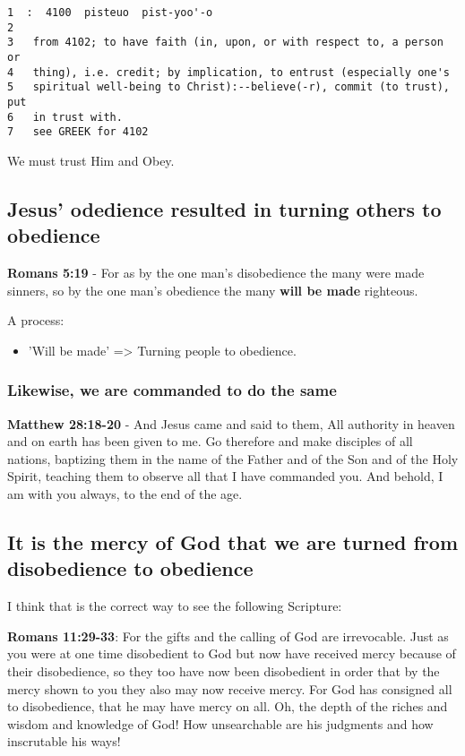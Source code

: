 \documentclass[11pt]{article}
\begin{document}
\begin{verbatim}
1  :  4100  pisteuo  pist-yoo'-o
2  
3   from 4102; to have faith (in, upon, or with respect to, a person or
4   thing), i.e. credit; by implication, to entrust (especially one's
5   spiritual well-being to Christ):--believe(-r), commit (to trust), put
6   in trust with.
7   see GREEK for 4102
\end{verbatim}

We must trust Him and Obey.

\subsection{Jesus' odedience resulted in turning others to obedience}
\label{sec:org454bb71}
\textbf{Romans 5:19} - For as by the one man's disobedience the many were made sinners, so by the one man's obedience the many \textbf{will be made} righteous.

A process:
\begin{itemize}
\item 'Will be made' => Turning people to obedience.
\end{itemize}

\subsubsection{Likewise, we are commanded to do the same}
\label{sec:org4e70e33}
\textbf{Matthew 28:18-20} - And Jesus came and said to them, All authority in heaven and on earth has been given to me. Go therefore and make disciples of all nations, baptizing them in the name of the Father and of the Son and of the Holy Spirit, teaching them to observe all that I have commanded you. And behold, I am with you always, to the end of the age.

\subsection{It is the mercy of God that we are turned from disobedience to obedience}
\label{sec:org965c25f}
I think that is the correct way to see the following Scripture:

\textbf{Romans 11:29-33}: For the gifts and the calling of God are irrevocable. Just as you were at one time disobedient to God but now have received mercy because of their disobedience, so they too have now been disobedient in order that by the mercy shown to you they also may now receive mercy. For God has consigned all to disobedience, that he may have mercy on all. Oh, the depth of the riches and wisdom and knowledge of God! How unsearchable are his judgments and how inscrutable his ways!
\end{document}
